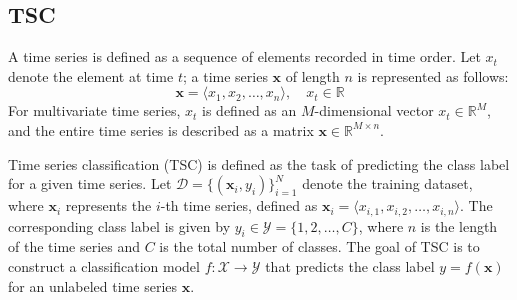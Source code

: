 \documentclass[conference]{IEEEtran}
\begin{document}
\subsection{TSC}
A time series is defined as a sequence of elements recorded in time order. Let $x_t$ denote the element at time $t$; a time series $\mathbf{x}$ of length $n$ is represented as follows:
$$\mathbf{x} = \langle x_1, x_2, \dots, x_n \rangle, \quad x_t \in \mathbb{R}$$
For multivariate time series, $x_t$ is defined as an $M$-dimensional vector $x_t \in \mathbb{R}^M$, and the entire time series is described as a matrix $\mathbf{x} \in \mathbb{R}^{M \times n}$.

Time series classification (TSC) is defined as the task of predicting the class label for a given time series.
Let $\mathcal{D} = \{(\mathbf{x}_i, y_i)\}_{i=1}^N$ denote the training dataset, where $\mathbf{x}_i$ represents the $i$-th time series, defined as $\mathbf{x}_i = \langle x_{i,1}, x_{i,2}, \dots, x_{i,n} \rangle$. The corresponding class label is given by $y_i \in \mathcal{Y} = \{1, 2, \dots, C\}$, where $n$ is the length of the time series and $C$ is the total number of classes. The goal of TSC is to construct a classification model $f: \mathcal{X} \to \mathcal{Y}$ that predicts the class label $y = f(\mathbf{x})$ for an unlabeled time series $\mathbf{x}$.
\end{document}
